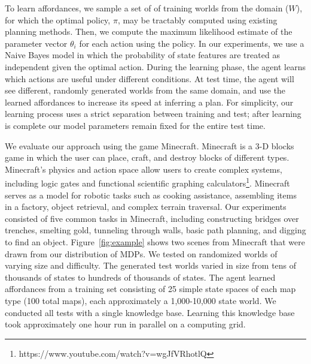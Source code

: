 To learn affordances, we sample a set of of training worlds from the
domain ($W$), for which the optimal policy, $\pi$, may be tractably
computed using existing planning methods. Then, we compute the maximum
likelihood estimate of the parameter vector $\theta_i$ for each action
using the policy. In our experiments, we use a Naive Bayes model
in which the probability of state features are treated as independent given
the optimal action.
During the learning phase, the agent learns which
actions are useful under different conditions. At test time, the agent
will see different, randomly generated worlds from the same domain,
and use the learned affordances to increase its speed at inferring a
plan. 
For simplicity, our learning process uses a strict separation
between training and test; after learning is complete our model
parameters remain fixed for the entire test time. 

We evaluate our approach using the game Minecraft.  Minecraft is a 3-D
blocks game in which the user can place, craft, and destroy blocks of
different types.  Minecraft's physics and action space allow users to
create complex systems, including logic gates and functional
scientific graphing
calculators\footnote{https://www.youtube.com/watch?v=wgJfVRhotlQ}.
Minecraft serves as a model for robotic tasks such as cooking
assistance, assembling items in a factory, object retrieval, and
complex terrain traversal.
Our experiments consisted of five common tasks in
Minecraft, including constructing bridges over trenches, smelting
gold, tunneling through walls, basic path planning, and digging to
find an object. Figure~\ref{fig:example} shows two scenes
from Minecraft that were drawn from our distribution of MDPs.  
We tested on randomized worlds of varying size and
difficulty. The generated test worlds varied in size from tens of
thousands of states to hundreds of thousands of states.  The agent
learned affordances from a training set consisting of 25 simple state
spaces of each map type (100 total maps), each approximately a
1,000-10,000 state world. We conducted all tests with a single
knowledge base. Learning this knowledge base took approximately one
hour run in parallel on a computing grid.


